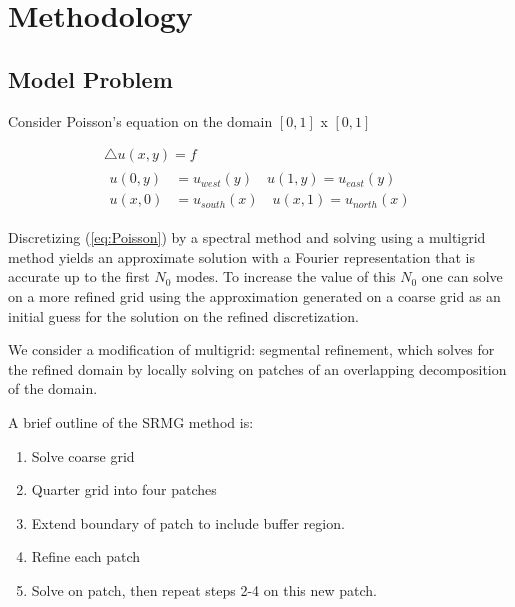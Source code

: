 \documentclass[final]{siamart1116}
\numberwithin{theorem}{section}
\begin{document}
\section{Methodology}\label{sec:method}
\subsection{Model Problem}
Consider Poisson's equation on the domain $[0, 1]$ x $[0, 1]$

\begin{gather}
  \bigtriangleup  u(x,y) = f \label{eq:Poisson} \\
  \begin{split}
    u(0,y) &= u_{west}(y) \quad u(1,y) = u_{east}(y) \label{boundary} \\
    u(x,0) &= u_{south}(x) \quad u(x,1) = u_{north}(x) \nonumber
  \end{split}
\end{gather}



Discretizing (\ref{eq:Poisson}) by a spectral method and solving using a multigrid method yields an approximate solution with a Fourier representation that is accurate up to the first $N_0$ modes. To increase the value of this $N_0$ one can solve on a more refined grid using the approximation generated on a coarse grid as an initial guess for the solution on the refined discretization. 

We consider a modification of multigrid: segmental refinement, which solves for the refined domain by locally solving on patches of an overlapping decomposition of the domain. 

A brief outline of the SRMG method is:

\begin{enumerate}
\item Solve coarse grid 
\item Quarter grid into four patches
\item Extend boundary of patch to include buffer region. 
\item Refine each patch
\item Solve on patch, then repeat steps 2-4 on this new patch. 
\end{enumerate}
\end{document}
